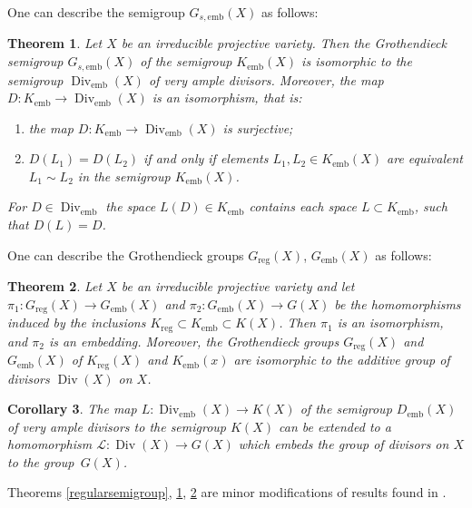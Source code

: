 \documentclass[11pt]{article}
\theoremstyle{plain}
\newtheorem{theorem}{Theorem}[section]
\newtheorem{corollary}[theorem]{Corollary}
\theoremstyle{definition}
\newcommand\Div{\operatorname{Div}}
\begin{document}
One can  describe the   semigroup $G_{s,\mathrm{emb}}(X)$ as follows:

\begin{theorem}\label{embesemigroup} Let $X$ be  an irreducible  projective variety. Then the Grothendieck semigroup $G_{s,\mathrm{emb}}(X)$ of the semigroup $K_\mathrm{emb}(X)$  is isomorphic to  the semigroup $\Div_\mathrm{emb}(X)$ of very ample  divisors. Moreover, the map $D:K_\mathrm{emb} \to \Div_\mathrm{emb}(X)$ is an isomorphism, that is:
\begin{enumerate}
\item the map $D:K_\mathrm{emb} \to \Div_\mathrm{emb}(X)$ is surjective;

\item $D(L_1)=D(L_2)$  if and only if  elements $L_1,L_2\in K_\mathrm{emb}(X)$ are equivalent $L_1\sim L_2$ in the semigroup $K_\mathrm{emb}(X)$.
    \end{enumerate}
 For $D\in \Div_\mathrm{emb}$ the space $L(D)\in K_\mathrm{emb}$ contains each space  $L\subset K_\mathrm{emb}$,  such that $D(L)=D$.
  \end{theorem}


One can describe the Grothendieck groups $G_\mathrm{reg}(X)$, $G_\mathrm{emb}(X)$ as follows:


\begin{theorem}\label{regulargroup} Let $X$ be  an irreducible  projective variety and let $\pi_1:G_\mathrm{reg}(X)\to G_\mathrm{emb}(X)$ and $\pi_2:G_\mathrm{emb}(X)\to G(X)$ be the homomorphisms induced by the inclusions  $K_\mathrm{reg}\subset K_\mathrm{emb}\subset K(X)$. Then $\pi_1$ is an isomorphism, and $\pi_2$ is an embedding.
Moreover, the Grothendieck groups $G_\mathrm{reg}(X)$  and $G_\mathrm{emb}(X)$ of $K_\mathrm{reg}(X)$ and $K_\mathrm{emb}(x)$ are isomorphic to   the additive group of   divisors $\Div (X)$ on $X$.
 \end{theorem}

\begin{corollary} The map $ L: \Div_\mathrm{emb}(X)\to K(X)$ of the semigroup $D_\mathrm{emb}(X)$ of very ample  divisors to the semigroup $K(X)$ can be extended to a homomorphism $\mathcal L:\Div(X)\to G(X)$ which embeds the group of  divisors on $X$ to the group~$G(X)$.
\end{corollary}

Theorems \ref{regularsemigroup}, \ref{embesemigroup}, \ref{regulargroup} are minor modifications of results found in  \cite{K-K10}.
\end{document}
